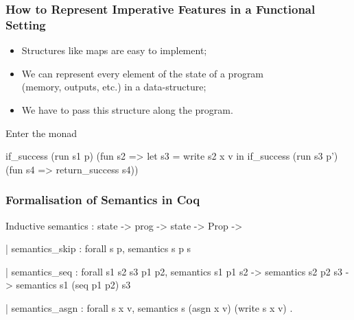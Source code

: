 \documentclass{beamer}
\begin{document}
\begin{frame}[fragile]
    \label{frame:imperative:functional}
    \frametitle{How to Represent Imperative Features in a Functional Setting}

    \begin{itemize}
        \item Structures like maps are easy to implement;
        \item We can represent every element of the state of a program \\
            (memory, outputs, etc.) in a data-structure;
        \item We have to pass this structure along the program.
    \end{itemize}

    \begin{block}{Enter the monad}
\begin{camlcode}
if_success (run s1 p) (fun s2 =>
  let s3 = write s2 x v in
  if_success (run s3 p') (fun s4 =>
    return_success s4))
\end{camlcode}
    \end{block}

\end{frame}

\frame{\questiontoc}

\begin{frame}[fragile]
    \label{frame:semantics:coq}
    \frametitle{Formalisation of Semantics in Coq}

\begin{coqcode}
Inductive semantics : state -> prog -> state -> Prop ->

  | semantics_skip : forall s p, semantics s p s

  | semantics_seq : forall s1 s2 s3 p1 p2,
    semantics s1 p1 s2 ->
    semantics s2 p2 s3 ->
    semantics s1 (seq p1 p2) s3

  | semantics_asgn : forall s x v,
    semantics s (asgn x v) (write s x v)
  .
\end{coqcode}

\end{frame}
\end{document}
